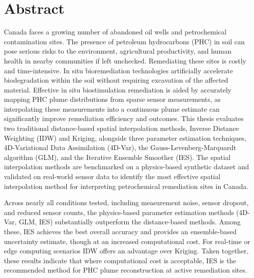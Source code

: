 \newpage


\section*{\large Abstract}

Canada faces a growing number of abandoned oil wells and petrochemical contamination sites. The presence of petroleum hydrocarbons (PHC) in soil can pose serious risks to the environment, agricultural productivity, and human health in nearby communities if left unchecked. Remediating these sites is costly and time-intensive. In situ bioremediation technologies artificially accelerate biodegradation within the soil without requiring excavation of the affected material. Effective in situ biostimulation remediation is aided by accurately mapping PHC plume distributions from sparse sensor measurements, as interpolating these measurements into a continuous plume estimate can significantly improve remediation efficiency and outcomes. This thesis evaluates two traditional distance-based spatial interpolation methods, Inverse Distance Weighting (IDW) and Kriging, alongside three parameter estimation techniques, 4D-Variational Data Assimilation (4D-Var), the Gauss-Levenberg-Marquardt algorithm (GLM), and the Iterative Ensemble Smoother (IES). The spatial interpolation methods are benchmarked on a physics-based synthetic dataset and validated on real-world sensor data to identify the most effective spatial interpolation method for interpreting petrochemical remediation sites in Canada. 

Across nearly all conditions tested, including measurement noise, sensor dropout, and reduced sensor counts, the physics-based parameter estimation methods (4D-Var, GLM, IES) substantially outperform the distance-based methods. Among these, IES achieves the best overall accuracy and provides an ensemble-based uncertainty estimate, though at an increased computational cost. For real-time or edge computing scenarios IDW offers an advantage over Kriging. Taken together, these results indicate that where computational cost is acceptable, IES is the recommended method for PHC plume reconstruction at active remediation sites.